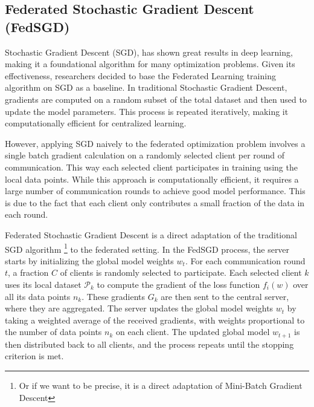 \subsection{Federated Stochastic Gradient Descent (FedSGD)}
Stochastic Gradient Descent (SGD), has shown great results in deep learning, making it a foundational algorithm for many
optimization problems. Given its effectiveness, researchers decided to base the Federated Learning training algorithm on
SGD as a baseline. In traditional Stochastic Gradient Descent,
gradients are computed on a random subset of the total dataset and then used to
update the model parameters. This process is repeated iteratively, making it computationally efficient for centralized learning.

However, applying SGD naively to the federated optimization problem involves a single batch gradient calculation on a randomly
selected client per round of communication. This way each selected client participates in training using the local data points.
While this approach is computationally efficient, it requires a large number of
communication rounds to achieve good model performance. This is due to the fact that each client only contributes a small fraction
of the data in each round.

Federated Stochastic Gradient Descent is a direct adaptation of the traditional SGD algorithm
\footnote{Or if we want to be precise, it is a direct adaptation of Mini-Batch Gradient Descent}
to the federated setting. In the FedSGD process, the server starts by initializing the global model weights \( w_t \). For each
communication round \( t \), a fraction \( C \) of clients is randomly selected to participate. Each selected client \( k \) uses its
local dataset \( \mathcal{P}_k \) to compute the gradient of the loss function \( f_i(w) \) over all its data points \( n_k \). These
gradients \( G_k \) are then sent to the central server, where they are aggregated. The server updates the global model weights \( w_t \)
by taking a weighted average of the received gradients, with weights proportional to the number of data points \( n_k \) on each client.
The updated global model \( w_{t+1} \) is then distributed back to all clients, and the process repeats until the stopping criterion is met.

